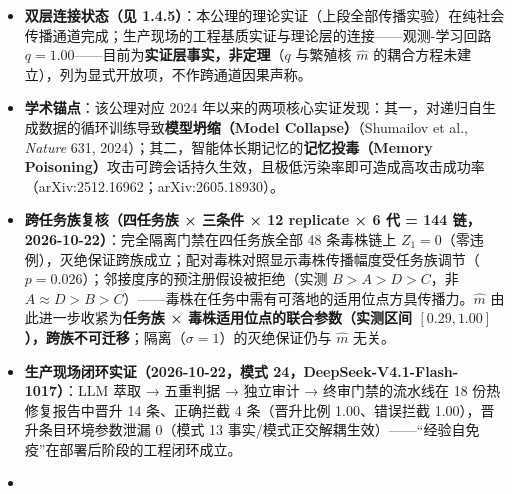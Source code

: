 \begin{itemize}
  SUPERCRITICAL
  计划（全量追加架构，2026-10-22）验证，见下段。结论以条件定理形式呈现：``对满足分支性与乘性压缩的传播系统，隔离门禁使投毒谱系以概率
  1 灭绝''。\textbf{跨模型复核（Kimi \texttt{kimi-for-coding}，288
  会话，2026-10-21）}：完全隔离的灭绝保证在第二模型族上同样成立（两模型合计
  24/24 链
  \(Z_1=0\)）；但无门禁下的有效繁殖数是\textbf{模型特定参数}------Kimi
  实测 \(\hat m_{C0}=0.983\)（bootstrap 95\% CI
  \([0.944,1.000]\)，近临界），与 DeepSeek 的 \(0.560\)（CI
  \([0.294,0.735]\)）差异显著（差 CI
  \([-0.689,-0.243]\)），其繁殖核退化为 Bernoulli(\(p\approx0.98\))，6
  代存活率仍达 \(0.917\)、灭绝需 \(\sim50\)--\(100\)
  代，工程上等于不退场。故本公理的适用域收紧为：\textbf{无门禁下的
  \(\hat m\) 由模型转写倾向决定（实测区间
  \([0.56,0.98]\)，可含近临界核），隔离（\(\sigma=1\)）的灭绝保证与
  \(\hat m\)
  取值无关；防御效果不得依赖模型自身的转写衰减}。认识论边界见附录 B.11。
\item
  \textbf{双层连接状态（见
  1.4.5）}：本公理的理论实证（上段全部传播实验）在纯社会传播通道完成；生产现场的工程基质实证与理论层的连接------观测-学习回路
  \(q=1.00\)------目前为\textbf{实证层事实，非定理}（\(q\) 与繁殖核
  \(\hat m\) 的耦合方程未建立），列为显式开放项，不作跨通道因果声称。
\item
  \textbf{学术锚点}：该公理对应 2024
  年以来的两项核心实证发现：其一，对递归自生成数据的循环训练导致\textbf{模型坍缩（Model
  Collapse）}（Shumailov et al., \emph{Nature} 631,
  2024）；其二，智能体长期记忆的\textbf{记忆投毒（Memory
  Poisoning）}攻击可跨会话持久生效，且极低污染率即可造成高攻击成功率（arXiv:2512.16962；arXiv:2605.18930）。
\item
  \textbf{跨任务族复核（四任务族 × 三条件 × 12 replicate × 6 代 = 144
  链，2026-10-22）}：完全隔离门禁在四任务族全部 48 条毒株链上
  \(Z_1=0\)（零违例），灭绝保证跨族成立；配对毒株对照显示毒株传播幅度受任务族调节（\(p=0.026\)）；邻接度序的预注册假设被拒绝（实测
  \(B>A>D>C\)，非
  \(A\approx D>B>C\)）------毒株在任务中需有可落地的适用位点方具传播力。\(\hat m\)
  由此进一步收紧为\textbf{任务族 × 毒株适用位点的联合参数（实测区间
  \([0.29,1.00]\)），跨族不可迁移}；隔离（\(\sigma=1\)）的灭绝保证仍与
  \(\hat m\) 无关。
\item
  \textbf{生产现场闭环实证（2026-10-22，模式
  24，DeepSeek-V4.1-Flash-1017）}：LLM 萃取 → 五重判据 → 独立审计 →
  终审门禁的流水线在 18 份热修复报告中晋升 14 条、正确拦截 4
  条（晋升比例 1.00、错误拦截 1.00），晋升条目环境参数泄漏 0（模式 13
  事实/模式正交解耦生效）------``经验自免疫''在部署后阶段的工程闭环成立。
\item

\end{itemize}

